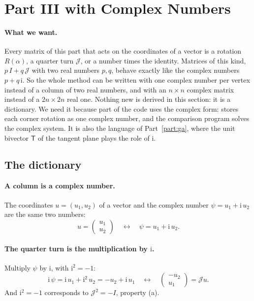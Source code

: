 \section{Part III with Complex Numbers}
\label{section:int_matrix}

\paragraph{What we want.} Every matrix of this part that acts on the coordinates of a vector is a rotation $R(\alpha)$, a quarter turn $\mathcal J$, or a number times the identity. Matrices of this kind, $p\,I + q\,\mathcal J$ with two real numbers $p, q$, behave exactly like the complex numbers $p + q\,\mathrm i$. So the whole method can be written with one complex number per vertex instead of a column of two real numbers, and with an $n \times n$ complex matrix instead of a $2n \times 2n$ real one. Nothing new is derived in this section: it is a dictionary. We need it because part of the code uses the complex form:  stores each corner rotation as one complex number, and the comparison program  solves the complex system. It is also the language of Part~\ref{part:ga}, where the unit bivector $\mathsf T$ of the tangent plane plays the role of $\mathrm i$.

\subsection{The dictionary}

\paragraph{A column is a complex number.} The coordinates $u = (u_1, u_2)$ of a vector and the complex number $\psi = u_1 + \mathrm i\,u_2$ are the same two numbers:
\begin{equation*}
u = \begin{pmatrix} u_1 \\ u_2\end{pmatrix} \quad\longleftrightarrow\quad \psi = u_1 + \mathrm i\, u_2 .
\end{equation*}

\paragraph{The quarter turn is the multiplication by $\mathrm i$.} Multiply $\psi$ by $\mathrm i$, with $\mathrm i^2 = -1$:
\begin{equation*}
\mathrm i\,\psi = \mathrm i\,u_1 + \mathrm i^2\, u_2 = -u_2 + \mathrm i\, u_1 \quad\longleftrightarrow\quad \begin{pmatrix} -u_2 \\ u_1\end{pmatrix} = \mathcal J u .
\end{equation*}
And $\mathrm i^2 = -1$ corresponds to $\mathcal J^2 = -I$, property (a).

